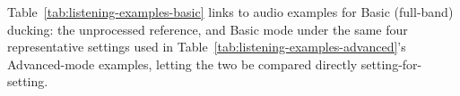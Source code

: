 %
%
%

\noindent Table~\ref{tab:listening-examples-basic} links to audio examples
for Basic (full-band) ducking: the unprocessed reference, and Basic mode
under the same four representative settings used in
Table~\ref{tab:listening-examples-advanced}'s Advanced-mode examples,
letting the two be compared directly setting-for-setting.

